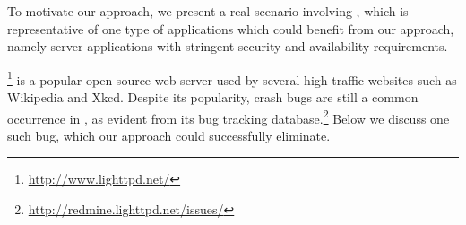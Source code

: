 

To motivate our approach, we present a real scenario involving
\lighttpd, which is representative of one type of applications which
could benefit from our approach, namely server applications with
stringent security and availability requirements.


\lighttpd\footnote{\url{http://www.lighttpd.net/}} is a popular open-source 
web-server used 
by several high-traffic websites such as Wikipedia and Xkcd.
Despite its popularity, crash bugs are still a common
occurrence in \lighttpd, as evident from its bug tracking
database.\footnote{\url{http://redmine.lighttpd.net/issues/}}  Below
we discuss one such bug, which our approach could successfully
eliminate.


